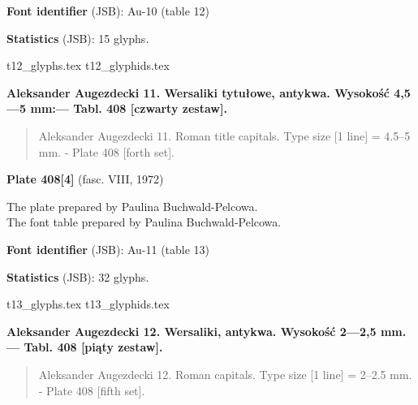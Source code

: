 \documentclass[12pt]{article}
\newcommand{\bg}{\begingl}
\newcommand{\pismoPL}[1]{{\relsize{2}\Junicode\textbf{#1}}}
\newcommand{\pismoEN}[1]{{\relsize{1}\Junicode\begin{quote}#1\end{quote}}}
\newcommand{\plate}[3]{\textbf{Plate #1} (fasc. #2, #3)}
\newcommand{\fontID}[2]{{\relsize{1}\Junicode\textbf{Font identifier} (JSB): #1 (table #2)}}
\newcommand{\fontstat}[1]{{\relsize{1}\Junicode\textbf{Statistics} (JSB): #1 glyphs.}}
\begin{document}
\fontID{Au-10}{12}

\fontstat{15}

    
  {t12_glyphs.tex}
  {t12_glyphids.tex}

 \newpage
 


\pismoPL{Aleksander Augezdecki 11. Wersaliki tytułowe, antykwa. Wysokość 4,5—5 mm:— Tabl. 408 [czwarty zestaw].}

\pismoEN{Aleksander Augezdecki 11. Roman title capitals. Type size [1 line] = 4.5--5 mm. - Plate 408 [forth set].}
\medskip

\plate{408[4]}{VIII}{1972}

The plate    prepared by Paulina Buchwald-Pelcowa.\\
The font table    prepared by Paulina Buchwald-Pelcowa.\\


\bigskip

\fontID{Au-11}{13}

\fontstat{32}

  {t13_glyphs.tex}
  {t13_glyphids.tex}

\newpage
 


\pismoPL{Aleksander Augezdecki 12. Wersaliki, antykwa. Wysokość 2—2,5 mm. — Tabl. 408 [piąty zestaw].}

\pismoEN{Aleksander Augezdecki 12. Roman capitals. Type size [1 line] = 2--2.5 mm. - Plate 408 [fifth set].}
\medskip
\end{document}
